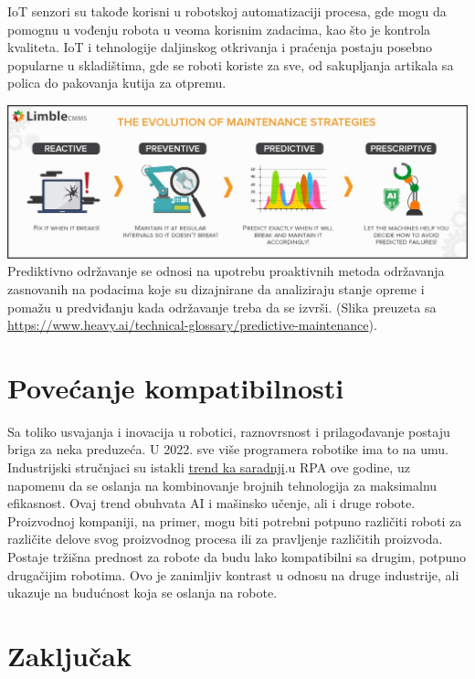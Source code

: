 \documentclass{report}
\begin{document}
	IoT senzori su takođe korisni u robotskoj automatizaciji procesa, gde mogu da pomognu u vođenju robota u veoma korisnim zadacima, kao što je kontrola kvaliteta. IoT i tehnologije daljinskog otkrivanja i praćenja postaju posebno popularne u skladištima, gde se roboti koriste za sve, od sakupljanja artikala sa polica do pakovanja kutija za otpremu.
	\cite{robotic2022}
	
	
	\centering
	\vspace{2cm}
	\includegraphics[scale=0.37]{dijagram.jpeg}
	Prediktivno održavanje se odnosi na upotrebu proaktivnih metoda održavanja zasnovanih na podacima koje su dizajnirane da analiziraju stanje opreme i pomažu u predviđanju kada održavanje treba da se izvrši. (Slika preuzeta sa \url{https://www.heavy.ai/technical-glossary/predictive-maintenance}).
	
	\chapter{Povećanje kompatibilnosti}
	Sa toliko usvajanja i inovacija u robotici, raznovrsnost i prilagođavanje postaju briga za neka preduzeća. U 2022. sve više programera robotike ima to na umu. Industrijski stručnjaci su istakli
	\href{https://enterprisersproject.com/article/2022/1/4-robotic-process-automation-rpa-trends-watch-2022}{trend ka saradnji}.u RPA ove godine, uz napomenu da se oslanja na kombinovanje brojnih tehnologija za maksimalnu efikasnost.
	Ovaj trend obuhvata AI i mašinsko učenje, ali i druge robote. Proizvodnoj kompaniji, na primer, mogu biti potrebni potpuno različiti roboti za različite delove svog proizvodnog procesa ili za pravljenje različitih proizvoda. Postaje tržišna prednost za robote da budu lako kompatibilni sa drugim, potpuno drugačijim robotima. Ovo je zanimljiv kontrast u odnosu na druge industrije, ali ukazuje na budućnost koja se oslanja na robote.
	\cite{robot2022}
	
	\chapter{Zaključak}
	
\end{document}
